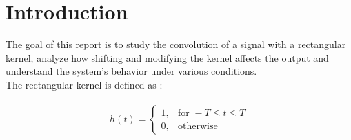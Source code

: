 \documentclass[12pt,a4paper]{report}
\begin{document}

\tableofcontents
\chapter{Introduction}
    The goal of this report is to study the convolution of a signal with a rectangular kernel, analyze how shifting and modifying the kernel affects the output and understand the system’s behavior under various conditions.\\
    The rectangular kernel is defined as :\\\\
    \[h(t) = \begin{cases}
1, & \text{for } -T \leq t \leq T \\
0, & \text{otherwise}
\end{cases}
\]
\end{document}
